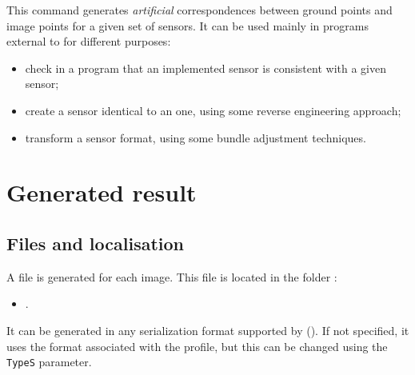\documentclass[a4paper]{article}
\begin{document}
\CmdTitle

\tableofcontents


\SecDescr

This command generates \emph{artificial} correspondences between ground points
and image points for a given set of sensors. It can be used mainly in programs
external to \MMVII for different purposes:

\begin{itemize}
  \item check in a program that an implemented sensor is consistent with a
        given \MMVII sensor;
  \item create a sensor identical to an \MMVII one, using some reverse
        engineering approach;
  \item transform a sensor format, using some bundle adjustment techniques.
\end{itemize}


\section{Generated result}


\subsection{Files and localisation}

A file is generated for each image. This file is located in the folder :

\begin{itemize}
 \item {}. 
\end{itemize}


It can be generated in any
serialization format supported by \MMVII ().
If not specified, it uses the format associated with the profile, but this can
be changed using the \texttt{TypeS} parameter.

\end{document}
